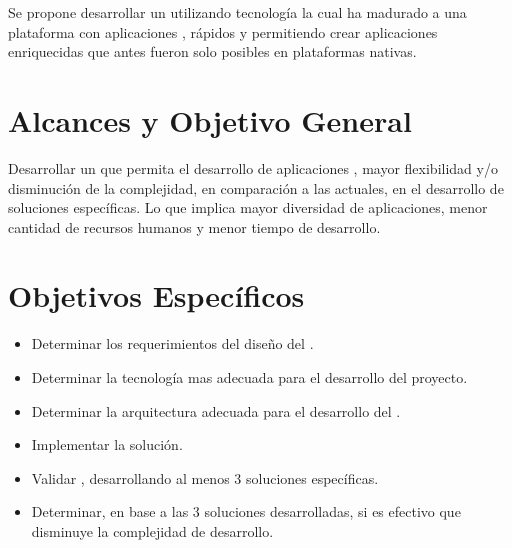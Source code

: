 
Se propone desarrollar un \frameworkPC utilizando tecnología \webINT la cual ha madurado a una plataforma con aplicaciones \fullFeatured, \javaScriptNAME \runtimeCPT rápidos y \standard \htmlfive permitiendo crear aplicaciones enriquecidas que antes fueron solo posibles en plataformas nativas.



\section{Alcances y Objetivo General}\label{cap:intro:alcances}

Desarrollar un \frameworkPC \ecommerce que permita el desarrollo de aplicaciones \fullFeatured \realTimeINT, mayor flexibilidad y/o disminución de la complejidad, en comparación a las \frameworksPC actuales, en el desarrollo de soluciones específicas. Lo que implica mayor diversidad de aplicaciones, menor cantidad de recursos humanos y menor tiempo de desarrollo.

\section{Objetivos Específicos}\label{cap:intro:objetivos}
\begin{itemize}
	\item Determinar los requerimientos del diseño del \frameworkPC.
	\item Determinar la tecnología mas adecuada para el desarrollo del proyecto.
	\item Determinar la arquitectura adecuada para el desarrollo del \frameworkPC.
	\item Implementar la solución.
	\item Validar \frameworkPC, desarrollando al menos 3 soluciones específicas.
	\item Determinar, en base a las 3 soluciones desarrolladas, si es efectivo que \frameworkPC disminuye la complejidad de desarrollo. 
\end{itemize}

%